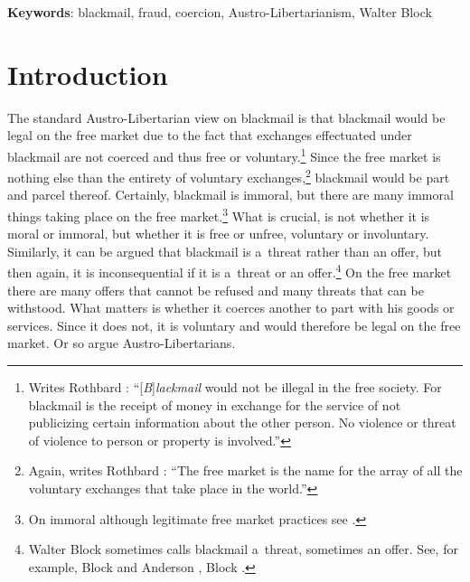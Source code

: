 \textbf{Keywords}: blackmail, fraud, coercion, Austro-Libertarianism, Walter Block



\section{Introduction}

The standard Austro-Libertarian view on blackmail is that blackmail would be legal on the free market due to the fact that exchanges effectuated under blackmail are not coerced and thus free or voluntary.\footnote{Writes Rothbard 
\parencite*[][p.183]{rothbard_man_2009}: %
 ``[\textit{B}]\textit{lackmail} would not be illegal in the free society. For blackmail is the receipt of money in exchange for the service of not publicizing certain information about the other person. No violence or threat of violence to person or property is involved.'' } Since the free market is nothing else than the entirety of voluntary exchanges,\footnote{Again, writes Rothbard 
\parencite*[][p.320]{rothbard_toward_2011}: %
 ``The free market is the name for the array of all the voluntary exchanges that take place in the world.'' } blackmail would be part and parcel thereof. Certainly, blackmail is immoral, but there are many immoral things taking place on the free market.\footnote{On immoral although legitimate free market practices see 
\parencite[][]{block_defending_2018}.%
} What is crucial, is not whether it is moral or immoral, but whether it is free or unfree, voluntary or involuntary. Similarly, it can be argued that blackmail is a~threat rather than an offer, but then again, it is inconsequential if it is a~threat or an offer.\footnote{Walter Block sometimes calls blackmail a~threat, sometimes an offer. See, for example, Block and Anderson 
\parencite*[][p.546]{block_blackmail_2000}, %
 Block 
\parencite*[][p.218]{block_libertarian_1998}.%
} On the free market there are many offers that cannot be refused and many threats that can be withstood. What matters is whether it coerces another to part with his goods or services. Since it does not, it is voluntary and would therefore be legal on the free market. Or so argue Austro-Libertarians.



